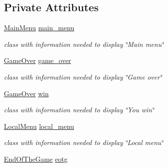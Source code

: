 \subsection*{Private Attributes}
\begin{DoxyCompactItemize}
\item 
\mbox{\label{class_model_af749476e8bdcd74948ebe837bd3dbfc8}} 
\hyperlink{class_main_menu}{Main\+Menu} \hyperlink{class_model_af749476e8bdcd74948ebe837bd3dbfc8}{main\+\_\+menu}
\begin{DoxyCompactList}\small\item\em class with information needed to display \char`\"{}\+Main menu\char`\"{} \end{DoxyCompactList}\item 
\mbox{\label{class_model_a905afcc359caed9ea41d17dfc5cef784}} 
\hyperlink{class_game_over}{Game\+Over} \hyperlink{class_model_a905afcc359caed9ea41d17dfc5cef784}{game\+\_\+over}
\begin{DoxyCompactList}\small\item\em class with information needed to display \char`\"{}\+Game over\char`\"{} \end{DoxyCompactList}\item 
\mbox{\label{class_model_a6e4433103b304e645fb85a6a9612b42e}} 
\hyperlink{class_game_over}{Game\+Over} \hyperlink{class_model_a6e4433103b304e645fb85a6a9612b42e}{win}
\begin{DoxyCompactList}\small\item\em class with information needed to display \char`\"{}\+You win\char`\"{} \end{DoxyCompactList}\item 
\mbox{\label{class_model_a53a6421a918ea8fab218d6eb7bc69119}} 
\hyperlink{class_local_menu}{Local\+Menu} \hyperlink{class_model_a53a6421a918ea8fab218d6eb7bc69119}{local\+\_\+menu}
\begin{DoxyCompactList}\small\item\em class with information needed to display \char`\"{}\+Local menu\char`\"{} \end{DoxyCompactList}\item 
\mbox{\label{class_model_a44c5d8b7f91c4a3ea5fe5643a6fbf26e}} 
\hyperlink{class_end_of_the_game}{End\+Of\+The\+Game} \hyperlink{class_model_a44c5d8b7f91c4a3ea5fe5643a6fbf26e}{eotg}

\end{DoxyCompactItemize}
